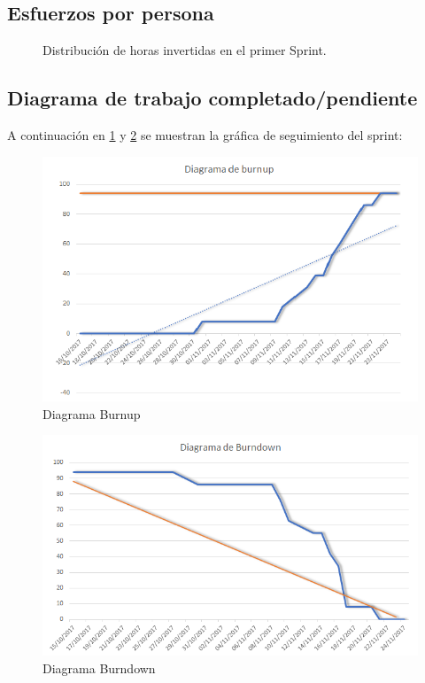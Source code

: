 \documentclass[11pt,a4paper]{report}
\begin{document}
\subsection{Esfuerzos por persona}
\begin{figure}[H]
	\centering
	\caption{Distribución de horas invertidas en el primer Sprint.}
\end{figure}
\subsection{Diagrama de trabajo completado/pendiente}
A continuación en \ref{fig: burup} y \ref{fig: burdow} se muestran la gráfica de seguimiento del sprint:
\begin{figure}[H]
	\centering
	\includegraphics[width=1\textwidth]{capturicas/burnup.png}
	\caption{Diagrama Burnup}
	\label{fig: burup}
\end{figure}
\begin{figure}[H]
	\centering
	\includegraphics[width=1\textwidth]{capturicas/burndown.png}
	\caption{Diagrama Burndown}
	\label{fig: burdow}
\end{figure}
\end{document}
